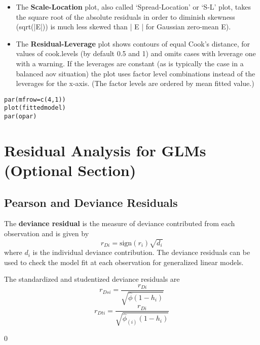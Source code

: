 \begin{itemize}
\item
The \textbf{Scale-Location} plot, also called ‘Spread-Location’ or ‘S-L’ plot, takes the square root of the absolute residuals in order to diminish skewness (sqrt(|E|)) is much less skewed than | E | for Gaussian zero-mean E).

\item
The \textbf{Residual-Leverage} plot shows contours of equal Cook's distance, for values of cook.levels (by default 0.5 and 1) and omits cases with leverage one with a warning. If the leverages are constant (as is typically the case in a balanced aov situation) the plot uses factor level combinations instead of the leverages for the x-axis. (The factor levels are ordered by mean fitted value.)
\end{itemize}
\begin{framed}
\begin{verbatim}
par(mfrow=c(4,1))
plot(fittedmodel)
par(opar)
\end{verbatim}
\end{framed}
\newpage
\section{Residual Analysis for GLMs (Optional Section)}

\subsection{Pearson and Deviance Residuals} 





The \textbf{deviance residual} is the measure of deviance contributed from each observation and is given by
\[r_{Di} = \textrm{sign}( r_{i})
 \sqrt{ d_{i}}\]
where $d_i$ is the individual deviance contribution.
The deviance residuals can be used to check the model fit at each observation for generalized linear models. 


The standardized and studentized deviance residuals are
\[
r_{Dsi} = \frac{r_{Di}}{\sqrt{\hat{ \phi} (1- h_{i})} }\]
\[r_{Dti} = \frac{r_{Di}}{\sqrt{ \hat{ \phi}_{(i)}
 (1- h_{i})}}\]
 
 



0